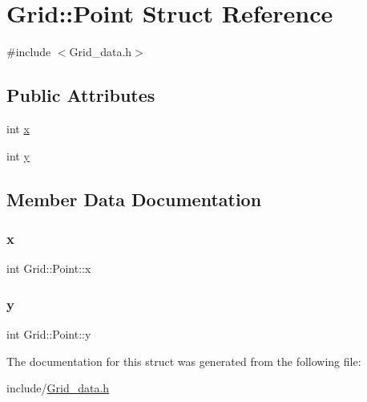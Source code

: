 \hypertarget{struct_grid_1_1_point}{}\section{Grid\+:\+:Point Struct Reference}
\label{struct_grid_1_1_point}


{\ttfamily \#include $<$Grid\+\_\+data.\+h$>$}

\subsection*{Public Attributes}
\begin{DoxyCompactItemize}
\item 
int \mbox{\hyperlink{struct_grid_1_1_point_a871d8f386a8bd9b86be70e664592e061}{x}}
\item 
int \mbox{\hyperlink{struct_grid_1_1_point_a2a97c42b80b2545d4f5498525237f87e}{y}}
\end{DoxyCompactItemize}


\subsection{Member Data Documentation}
\mbox{\label{struct_grid_1_1_point_a871d8f386a8bd9b86be70e664592e061}} 
\subsubsection{\texorpdfstring{x}{x}}
{\footnotesize\ttfamily int Grid\+::\+Point\+::x}

\mbox{\label{struct_grid_1_1_point_a2a97c42b80b2545d4f5498525237f87e}} 
\subsubsection{\texorpdfstring{y}{y}}
{\footnotesize\ttfamily int Grid\+::\+Point\+::y}



The documentation for this struct was generated from the following file\+:\begin{DoxyCompactItemize}
\item 
include/\mbox{\hyperlink{_grid__data_8h}{Grid\+\_\+data.\+h}}\end{DoxyCompactItemize}
